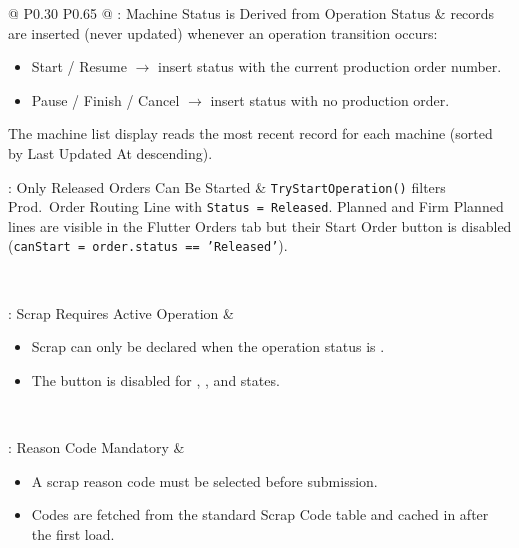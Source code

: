 \begin{longtable}{@{} P{0.30\linewidth} P{0.65\linewidth} @{}}
	: Machine Status is Derived from Operation Status &  records are inserted (never updated) whenever an operation transition occurs:
	\begin{itemize}[noitemsep, topsep=0pt, partopsep=0pt, leftmargin=*]
		\item Start / Resume $\rightarrow$ insert  status with the current production order number.
		\item Pause / Finish / Cancel $\rightarrow$ insert  status with no production order.
	\end{itemize}
	The machine list display reads the most recent record for each machine (sorted by Last Updated At descending). \\
	\midrule
	
	:  Only Released Orders Can Be Started & \texttt{TryStartOperation()} filters Prod.\ Order Routing Line with \texttt{Status = Released}. Planned and Firm Planned lines are visible in the Flutter Orders tab but their Start Order button is disabled (\texttt{canStart = order.status == 'Released'}). \\
	\midrule
	
	 \\
	\midrule
	
	: Scrap Requires Active Operation & 
	\begin{itemize}
		\item Scrap can only be declared when the operation status is .
		\item The  button is disabled for ,
		      , and  states.
	\end{itemize} \\
	\midrule
	
	: Reason Code Mandatory & 
	\begin{itemize}
		\item A scrap reason code must be selected before submission.
		\item Codes are fetched from the standard  Scrap Code
		      table and cached in  after the first load.
	\end{itemize} \\
	\midrule
	
	 \\
	\midrule
	

\end{longtable}
